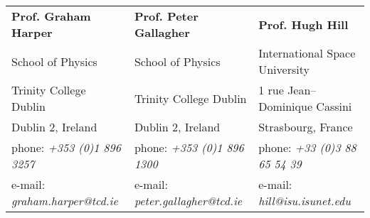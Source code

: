\documentclass[margin,line]{resume}
\begin{document}
\begin{resume}
\begin{tabular}{@{}p{4.6cm}p{4.6cm}p{4.8cm}}
\textbf{Prof. Graham Harper}       &  \textbf{Prof. Peter Gallagher}   &  \textbf{Prof. Hugh Hill} \\
School of Physics                      &  School of Physics                   &  International Space University \\
Trinity College Dublin                 &  Trinity College Dublin                   &  1 rue Jean--Dominique Cassini \\
Dublin 2, Ireland				       &  Dublin 2, Ireland		         &  Strasbourg, France \\
phone: \textsl{+353 (0)1 896 3257}    &  phone: \textsl{+353 (0)1 896 1300} &  phone: \textsl{+33 (0)3 88 65 54 39} \\
e-mail: \textsl{graham.harper@tcd.ie}   &  e-mail: \textsl{peter.gallagher@tcd.ie}&  e-mail: \textsl{hill@isu.isunet.edu} \\
\end{tabular}




\end{resume}
\end{document}
